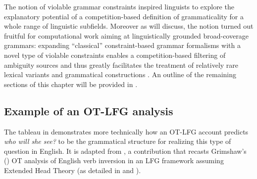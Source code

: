 \documentclass[output=paper,hidelinks]{langscibook}
\begin{document}
The notion of violable grammar constraints inspired linguists to explore the explanatory potential of a competition-based definition of grammaticality for a whole range of linguistic subfields. 
Moreover as   will discuss, the notion turned out fruitful for computational work aiming at linguistically grounded broad-coverage grammars:
expanding ``classical'' constraint-based grammar formalisms with a novel type of violable constraints enables a competition-based filtering of ambiguity sources and thus greatly facilitates the treatment of relatively rare lexical variants and grammatical constructions \citep{franketal01}.
An outline of the remaining sections of this chapter will be provided in . %

\subsection{Example of an OT-LFG analysis}
\label{sec:OT:initial-example}

The tableau in  demonstrates more technically how an OT-LFG account predicts \emph{who will she see?} to be the grammatical structure for realizing this type of question in English. It is adapted from \citet{Bresnan-Explaining-Morphosyntactic}, a contribution that recasts Grimshaw's (\citeyear{Grimshaw97})  OT analysis of English verb inversion in an LFG framework assuming Extended Head Theory (as detailed in \citealt[ch.~7]{bresnan2001lexical} and \citealt[ch.~7]{BresnanEtAl2016}). 
\end{document}
